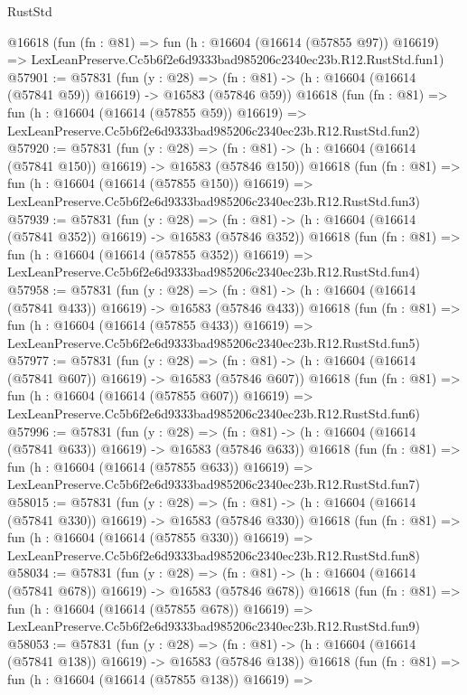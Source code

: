 \begin{lexlean}{RustStd}
\begin{coremodule}
    @16618
    (fun (fn : @81) =>
    fun (h : @16604 (@16614 (@57855 @97)) @16619) =>
    LexLeanPreserve.Cc5b6f2e6d9333bad985206c2340ec23b.R12.RustStd.fun1)
@57901 := @57831
    (fun (y : @28) =>
    (fn : @81) -> (h : @16604 (@16614 (@57841 @59)) @16619) -> @16583 (@57846 @59))
    @16618
    (fun (fn : @81) =>
    fun (h : @16604 (@16614 (@57855 @59)) @16619) =>
    LexLeanPreserve.Cc5b6f2e6d9333bad985206c2340ec23b.R12.RustStd.fun2)
@57920 := @57831
    (fun (y : @28) =>
    (fn : @81) -> (h : @16604 (@16614 (@57841 @150)) @16619) -> @16583 (@57846 @150))
    @16618
    (fun (fn : @81) =>
    fun (h : @16604 (@16614 (@57855 @150)) @16619) =>
    LexLeanPreserve.Cc5b6f2e6d9333bad985206c2340ec23b.R12.RustStd.fun3)
@57939 := @57831
    (fun (y : @28) =>
    (fn : @81) -> (h : @16604 (@16614 (@57841 @352)) @16619) -> @16583 (@57846 @352))
    @16618
    (fun (fn : @81) =>
    fun (h : @16604 (@16614 (@57855 @352)) @16619) =>
    LexLeanPreserve.Cc5b6f2e6d9333bad985206c2340ec23b.R12.RustStd.fun4)
@57958 := @57831
    (fun (y : @28) =>
    (fn : @81) -> (h : @16604 (@16614 (@57841 @433)) @16619) -> @16583 (@57846 @433))
    @16618
    (fun (fn : @81) =>
    fun (h : @16604 (@16614 (@57855 @433)) @16619) =>
    LexLeanPreserve.Cc5b6f2e6d9333bad985206c2340ec23b.R12.RustStd.fun5)
@57977 := @57831
    (fun (y : @28) =>
    (fn : @81) -> (h : @16604 (@16614 (@57841 @607)) @16619) -> @16583 (@57846 @607))
    @16618
    (fun (fn : @81) =>
    fun (h : @16604 (@16614 (@57855 @607)) @16619) =>
    LexLeanPreserve.Cc5b6f2e6d9333bad985206c2340ec23b.R12.RustStd.fun6)
@57996 := @57831
    (fun (y : @28) =>
    (fn : @81) -> (h : @16604 (@16614 (@57841 @633)) @16619) -> @16583 (@57846 @633))
    @16618
    (fun (fn : @81) =>
    fun (h : @16604 (@16614 (@57855 @633)) @16619) =>
    LexLeanPreserve.Cc5b6f2e6d9333bad985206c2340ec23b.R12.RustStd.fun7)
@58015 := @57831
    (fun (y : @28) =>
    (fn : @81) -> (h : @16604 (@16614 (@57841 @330)) @16619) -> @16583 (@57846 @330))
    @16618
    (fun (fn : @81) =>
    fun (h : @16604 (@16614 (@57855 @330)) @16619) =>
    LexLeanPreserve.Cc5b6f2e6d9333bad985206c2340ec23b.R12.RustStd.fun8)
@58034 := @57831
    (fun (y : @28) =>
    (fn : @81) -> (h : @16604 (@16614 (@57841 @678)) @16619) -> @16583 (@57846 @678))
    @16618
    (fun (fn : @81) =>
    fun (h : @16604 (@16614 (@57855 @678)) @16619) =>
    LexLeanPreserve.Cc5b6f2e6d9333bad985206c2340ec23b.R12.RustStd.fun9)
@58053 := @57831
    (fun (y : @28) =>
    (fn : @81) -> (h : @16604 (@16614 (@57841 @138)) @16619) -> @16583 (@57846 @138))
    @16618
    (fun (fn : @81) =>
    fun (h : @16604 (@16614 (@57855 @138)) @16619) =>

\end{coremodule}
\end{lexlean}
